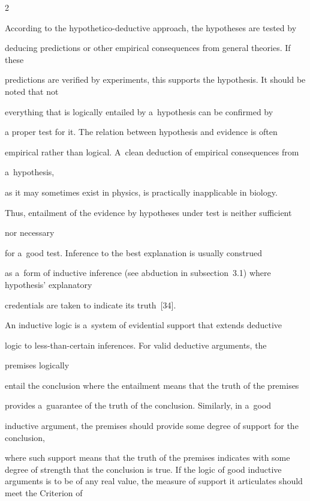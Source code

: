 \begin{multicols}{2}





\noindent


  According to the hypothetico-deductive approach, the hypotheses are tested by


deducing predictions or other empirical consequences from general theories. If these


predictions are verified by experiments, this supports the hypothesis. It should be noted that not


everything that is logically entailed by a~hypothesis can be confirmed by


a proper test for it. The relation between hypothesis and evidence is often


empirical rather than logical. A~clean deduction of empirical consequences from


a~hypothesis,


as it may sometimes exist in physics, is practically inapplicable in biology.


Thus, entailment of the evidence by hypotheses under test is neither sufficient


nor necessary


for a~good test. Inference to the best explanation is usually construed


as a~form of inductive inference (see abduction in subsection~3.1) where hypothesis' explanatory


credentials are taken to indicate its truth~[34].





  An inductive logic is a~system of evidential support that extends deductive


  logic to less-than-certain inferences.  For valid deductive arguments, the


  premises logically


entail the conclusion where the entailment means that the truth of the premises


provides a~guarantee of the truth of the conclusion. Similarly, in a~good


inductive argument, the premises should provide some degree of support for the conclusion,


where such support means that the truth of the premises indicates with some degree of strength that the conclusion is true. If the logic of good inductive arguments is to be of any real value, the measure of support it articulates should meet the Criterion of



\end{multicols}
